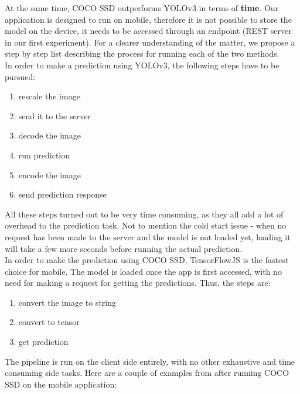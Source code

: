 \documentclass[runningheads,a4paper,11pt]{report}
\begin{document}
At the same time, COCO SSD outperforms YOLOv3 in terms of \textbf{time}. Our application is designed to run on mobile, therefore it is not possible to store the model on the device, it needs to be accessed through an endpoint (REST server in our first experiment). For a clearer understanding of the matter, we propose a step by step list describing the process for running each of the two methods. \\
In order to make a prediction using YOLOv3, the following steps have to be pursued:
\begin{enumerate}
    \item rescale the image
    \item send it to the server
    \item decode the image
    \item run prediction
    \item encode the image
    \item send prediction response
\end{enumerate}
All these steps turned out to be very time consuming, as they all add a lot of overhead to the prediction task. Not to mention the cold start issue - when no request has been made to the server and the model is not loaded yet, loading it will take a few more seconds before running the actual prediction.
\\
In order to make the prediction using COCO SSD, TensorFlowJS is the fastest choice for mobile. The model is loaded once the app is first accessed, with no need for making a request for getting the predictions. Thus, the steps are:
\begin{enumerate}
    \item convert the image to string
    \item convert to tensor
    \item get prediction
\end{enumerate}
The pipeline is run on the client side entirely, with no other exhaustive and time consuming side tasks. Here are a couple of examples from after running COCO SSD on the mobile application:
\end{document}
